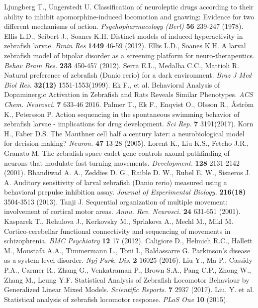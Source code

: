 \documentclass[a4paper,12pt]{article}
\begin{document}
\begin{thebibliography}{99}
Ljungberg T., Ungerstedt U. Classification of neuroleptic drugs according to their ability to inhibit apomorphine-induced locomotion and gnawing: Evidence for two different mechanisms of action. \textit{Psychopharmacology (Berl)} \textbf{56} 239-247 (1978). 
Ellis L.D., Seibert J., Soanes K.H. Distinct models of induced hyperactivity in zebrafish larvae. \textit{Brain Res} \textbf{1449} 46-59 (2012). 
Ellis L.D., Soanes K.H. A larval zebrafish model of bipolar disorder as a screening platform for neuro-therapeutics. \textit{Behav Brain Res.} \textbf{233} 450-457 (2012).
Serra E.L., Medalha C.C., Mattioli R. Natural preference of zebrafish (Danio rerio) for a dark environment. \textit{Braz J Med Biol Res.} \textbf{32(12)} 1551-1553(1999). 
Ek F., et al. Behavioral Analysis of Dopaminergic Activation in Zebrafish and Rats Reveals Similar Phenotypes. \textit{ACS Chem. Neurosci.} \textbf{7} 633-46 2016.
Palmer T., Ek F., Enqvist O., Olsson R., Åström K., Petersson P. Action sequencing in the spontaneous swimming behavior of zebrafish larvae - implications for drug development. \textit{Sci Rep.} \textbf{7} 3191(2017). 
Korn H., Faber D.S. The Mauthner cell half a century later: a neurobiological model for decision-making? \textit{Neuron.} \textbf{47} 13-28 (2005).
Lorent K., Liu K.S., Fetcho J.R., Granato M. The zebrafish space cadet gene controls axonal pathfinding of neurons that modulate fast turning movements. \textit{Development.} \textbf{128} 2131-2142 (2001).
Bhandiwad A. A., Zeddies D. G., Raible D. W., Rubel E. W., Sisneros J. A. Auditory sensitivity of larval zebrafish (Danio rerio) measured using a behavioral prepulse inhibition assay. \textit{Journal of Experimental Biology.} \textbf{216(18)} 3504-3513 (2013).
Tanji J. Sequential organization of multiple movement: involvement of cortical motor areas. \textit{Annu. Rev. Neurosci.} \textbf{24} 631-651 (2001).
Kasparek T., Rehulova J., Kerkovsky M., Sprlakova A., Mechl M., Mikl M. Cortico-cerebellar functional connectivity and sequencing of movements in schizophrenia. \textit{BMC Psychiatry} \textbf{12} 17 (2012).
Caligiore D., Helmich R.C., Hallett M., Moustafa A.A., Timmermann L., Toni I., Baldassarre G. Parkinson's disease as a system-level disorder. \textit{Npj Park. Dis.} \textbf{2} 16025 (2016).
Liu Y., Ma P., Cassidy P.A., Carmer R., Zhang G., Venkatraman P., Brown S.A., Pang C.P., Zhong W., Zhang M., Leung Y.F. Statistical Analysis of Zebrafish Locomotor Behaviour by Generalized Linear Mixed Models. \textit{Scientific Reports.} \textbf{7} 2937 (2017).
Liu, Y. et al. Statistical analysis of zebrafish locomotor response. \textit{PLoS One} \textbf{10} (2015).


\end{thebibliography}
\end{document}
